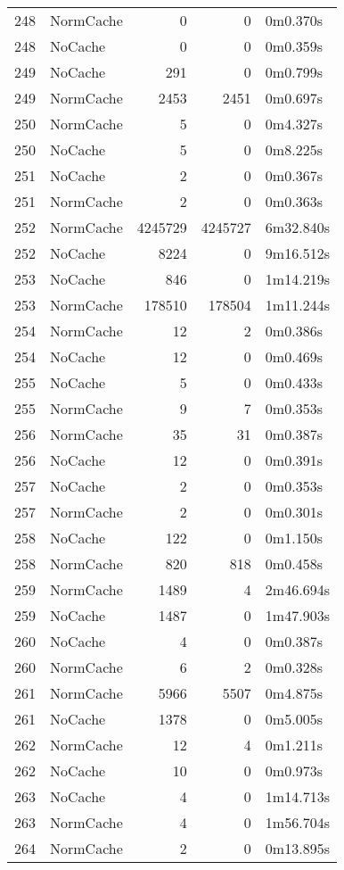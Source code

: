 \begin{tabular}{llrrl}
248 & NormCache & 0 & 0 & 0m0.370s \\
248 & NoCache & 0 & 0 & 0m0.359s \\
249 & NoCache & 291 & 0 & 0m0.799s \\
249 & NormCache & 2453 & 2451 & 0m0.697s \\
250 & NormCache & 5 & 0 & 0m4.327s \\
250 & NoCache & 5 & 0 & 0m8.225s \\
251 & NoCache & 2 & 0 & 0m0.367s \\
251 & NormCache & 2 & 0 & 0m0.363s \\
252 & NormCache & 4245729 & 4245727 & 6m32.840s \\
252 & NoCache & 8224 & 0 & 9m16.512s \\
253 & NoCache & 846 & 0 & 1m14.219s \\
253 & NormCache & 178510 & 178504 & 1m11.244s \\
254 & NormCache & 12 & 2 & 0m0.386s \\
254 & NoCache & 12 & 0 & 0m0.469s \\
255 & NoCache & 5 & 0 & 0m0.433s \\
255 & NormCache & 9 & 7 & 0m0.353s \\
256 & NormCache & 35 & 31 & 0m0.387s \\
256 & NoCache & 12 & 0 & 0m0.391s \\
257 & NoCache & 2 & 0 & 0m0.353s \\
257 & NormCache & 2 & 0 & 0m0.301s \\
258 & NoCache & 122 & 0 & 0m1.150s \\
258 & NormCache & 820 & 818 & 0m0.458s \\
259 & NormCache & 1489 & 4 & 2m46.694s \\
259 & NoCache & 1487 & 0 & 1m47.903s \\
260 & NoCache & 4 & 0 & 0m0.387s \\
260 & NormCache & 6 & 2 & 0m0.328s \\
261 & NormCache & 5966 & 5507 & 0m4.875s \\
261 & NoCache & 1378 & 0 & 0m5.005s \\
262 & NormCache & 12 & 4 & 0m1.211s \\
262 & NoCache & 10 & 0 & 0m0.973s \\
263 & NoCache & 4 & 0 & 1m14.713s \\
263 & NormCache & 4 & 0 & 1m56.704s \\
264 & NormCache & 2 & 0 & 0m13.895s \\

\end{tabular}
